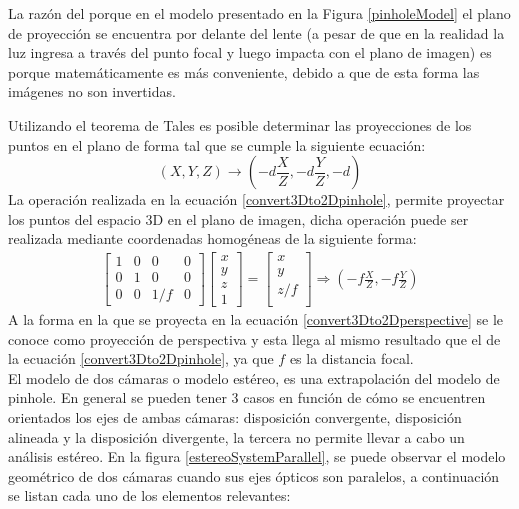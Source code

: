 La razón del porque en el modelo presentado en la Figura \ref{pinholeModel} el plano de proyección se encuentra por delante del lente (a pesar de que en la realidad la luz ingresa a través del punto focal y luego impacta con el plano de imagen) es porque matemáticamente es más conveniente, debido a que de esta forma las imágenes no son invertidas.

Utilizando el teorema de Tales es posible determinar las proyecciones de los puntos en el plano de forma tal que se cumple la siguiente ecuación:
\begin{equation}
    (X, Y, Z) \longrightarrow (-d\frac{X}{Z}, -d\frac{Y}{Z}, -d)  \label{convert3Dto2Dpinhole}
\end{equation}
La operación realizada en la ecuación \ref{convert3Dto2Dpinhole}, permite proyectar los puntos del espacio 3D en el plano de imagen, dicha operación puede ser realizada mediante coordenadas homogéneas de la siguiente forma:
\begin{align}
            \begin{bmatrix}
            1 & 0 & 0 & 0\\
            0 & 1 & 0 & 0\\
            0 & 0 & 1/f & 0
            \end{bmatrix}
            \begin{bmatrix}
            x\\
            y\\
            z\\
            1
            \end{bmatrix}
            =
            \begin{bmatrix}
            x\\
            y\\
            z/f\\
            \end{bmatrix} \Rightarrow \left(-f\frac{X}{Z}, -f\frac{Y}{Z}\right)\label{convert3Dto2Dperspective}
\end{align}
A la forma en la que se proyecta en la ecuación \ref{convert3Dto2Dperspective} se le conoce como proyección de perspectiva y esta llega al mismo resultado que el de la ecuación \ref{convert3Dto2Dpinhole}, ya que $f$ es la distancia focal.
\\
El modelo de dos cámaras o modelo estéreo, es una extrapolación del modelo de pinhole. En general se pueden tener 3 casos en función de cómo se encuentren orientados los ejes de ambas cámaras: disposición convergente, disposición alineada y la disposición divergente, la tercera no permite llevar a cabo un análisis estéreo. En la figura \ref{estereoSystemParallel}, se puede observar el modelo geométrico de dos cámaras  cuando sus ejes ópticos son paralelos, a continuación se listan cada uno de los elementos relevantes:
